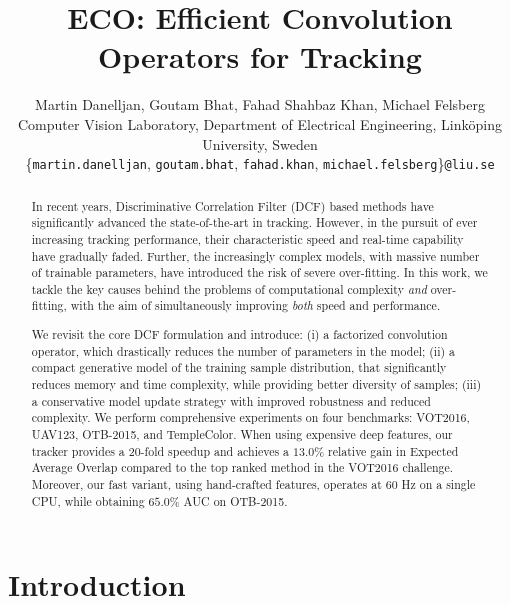 \documentclass[10pt,twocolumn,letterpaper]{article}
\begin{document}
\title{ECO: Efficient Convolution Operators for Tracking}

\author{Martin Danelljan, Goutam Bhat, Fahad Shahbaz Khan, Michael Felsberg \\
	\small Computer Vision Laboratory, Department of Electrical Engineering, Link\"oping University, Sweden\\
	\small\{\texttt{martin.danelljan},\; \texttt{goutam.bhat},\; \texttt{fahad.khan},\; \texttt{michael.felsberg}\}\texttt{@liu.se}
	{}
}

\maketitle


\begin{abstract}
   In recent years, Discriminative Correlation Filter (DCF) based methods have significantly advanced the state-of-the-art in tracking. However, in the pursuit of ever increasing tracking performance, their characteristic speed and real-time capability have gradually faded. Further, the increasingly complex models, with massive number of trainable parameters, have introduced the risk of severe over-fitting. In this work, we tackle the key causes behind the problems of computational complexity \emph{and} over-fitting, with the aim of simultaneously improving \emph{both} speed and performance.

We revisit the core DCF formulation and introduce: (i) a factorized convolution operator, which drastically reduces the number of parameters in the model; (ii) a compact generative model of the training sample distribution, that significantly reduces memory and time complexity, while providing better diversity of samples; (iii) a conservative model update strategy with improved robustness and reduced complexity. We perform comprehensive experiments on four benchmarks: VOT2016, UAV123, OTB-2015, and TempleColor.
When using expensive deep features, our tracker provides a 20-fold speedup and achieves a $13.0 \%$ relative gain in Expected Average Overlap compared to the top ranked method \cite{DanelljanECCV2016} in the VOT2016 challenge. Moreover, our fast variant, using hand-crafted features, operates at 60 Hz on a single CPU, while obtaining $65.0 \%$ AUC on OTB-2015. \end{abstract}



\section{Introduction}
\end{document}
